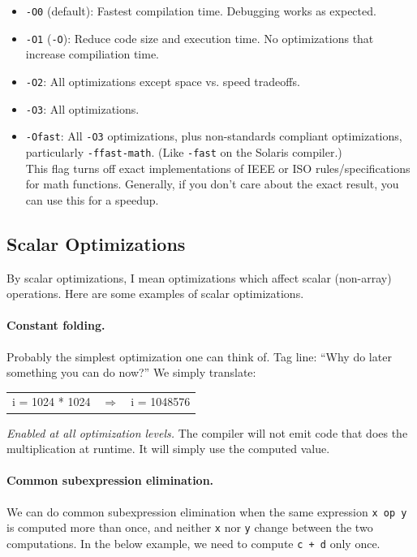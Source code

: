 \documentclass[a4paper]{report}
\begin{document}
\begin{itemize}[noitemsep]
\item {\tt -O0} (default): Fastest compilation time. Debugging works as expected.
\item {\tt -O1} ({\tt -O}): Reduce code size and execution time.
 No optimizations that increase compiliation time.
\item {\tt -O2}: All optimizations except space vs. speed tradeoffs.
\item {\tt -O3}: All optimizations.
\item {\tt -Ofast}: All {\tt -O3} optimizations, plus non-standards compliant optimizations,
      particularly {\tt -ffast-math}. (Like {\tt -fast} on the Solaris compiler.)\\[1em]
  This flag turns off exact implementations of IEEE or ISO rules/specifications for math
  functions. Generally, if you don't care about the exact result, you can use this for
  a speedup.
\end{itemize}

\subsection*{Scalar Optimizations}
By scalar optimizations, I mean optimizations
which affect scalar (non-array) operations. Here are some examples of scalar
optimizations.

\paragraph{Constant folding.} Probably the simplest optimization one can think of.
Tag line: ``Why do later something you can do now?'' We simply translate:

\begin{center}
\vspace*{-1em}
\begin{tabular}{lll}
i = 1024 * 1024 &
$\Longrightarrow$ &
i = 1048576
\end{tabular}
\end{center}

\noindent \emph{Enabled at all optimization levels.} The compiler will not emit
code that does the multiplication at runtime. It will simply use the
computed value.

\paragraph{Common subexpression elimination.} We can do common subexpression elimination
when the same expression {\tt x op y} is computed more than once, and
neither {\tt x} nor {\tt y} change between the two computations. In the
below example, we need to compute {\tt c + d} only once.
\end{document}
